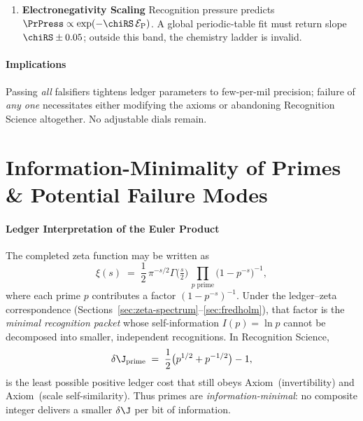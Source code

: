 \documentclass[11pt,oneside]{book}
\begin{document}
{\begin{enumerate}
\item \textbf{Electronegativity Scaling}  
      Recognition pressure predicts
      $\PrPress \propto \exp(-\chiRS\,\mathcal{E}_{\rm P})$.
      A global periodic-table fit must return
      slope $\chiRS\pm0.05$; outside this band,
      the chemistry ladder is invalid.

\end{enumerate}

\paragraph*{Implications}

Passing \emph{all} falsifiers tightens ledger parameters to
few-per-mil precision; failure of \emph{any one} necessitates
either modifying the axioms or abandoning Recognition Science
altogether.  No adjustable dials remain.

\section{Information-Minimality of Primes \& Potential Failure Modes}
\label{sec:prime-minimality}

\paragraph{Ledger Interpretation of the Euler Product}

The completed zeta function may be written as
\[
   \xi(s)
   \;=\;
   \frac{1}{2}\,\pi^{-s/2}\Gamma\!\bigl(\tfrac{s}{2}\bigr)\,
   \prod_{p\;\text{prime}}
   \bigl(1-p^{-s}\bigr)^{-1},
\]
where each prime $p$ contributes a factor
\(
   (1-p^{-s})^{-1}.
\)
Under the ledger–zeta correspondence
(Sections~\ref{sec:zeta-spectrum}–\ref{sec:fredholm}),
that factor is the \emph{minimal recognition packet} whose
self-information
\(
   I(p)=\ln p
\)
cannot be decomposed into smaller, independent recognitions.
In Recognition Science,
\[
   \delta\J_{\rm prime}
   \;=\;
   \frac{1}{2}\bigl(p^{1/2}+p^{-1/2}\bigr)-1,
\]
is the least possible positive ledger cost that still obeys
Axiom\, (invertibility) and
Axiom\, (scale self-similarity).
Thus primes are {\it information-minimal}: no composite integer
delivers a smaller $\delta\J$ per bit of information.

}
\end{document}
